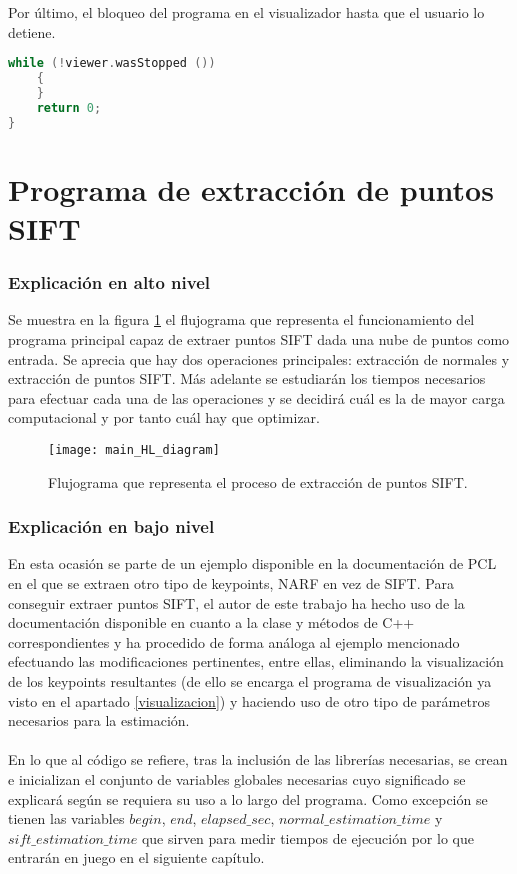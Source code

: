Por último, el bloqueo del programa en el visualizador hasta que el usuario lo detiene.
\begin{lstlisting}[language=C++,breaklines]
   while (!viewer.wasStopped ())
    {
    }
    return 0;
}
\end{lstlisting}
\fi


\section{Programa de extracción de puntos SIFT}\label{extraccion_sift}
\subsubsection{Explicación en alto nivel}
Se muestra en la figura \ref{fig:main_HL_diagram} el flujograma que representa el funcionamiento del programa principal capaz de extraer puntos SIFT dada una nube de puntos como entrada. Se aprecia que hay dos operaciones principales: extracción de normales\cite{normal} y extracción de puntos SIFT\cite{narf}. Más adelante se estudiarán los tiempos necesarios para efectuar cada una de las operaciones y se decidirá cuál es la de mayor carga computacional y por tanto cuál hay que optimizar.
\begin{figure}
\centering
\texttt{[image: main\_HL\_diagram]}
\caption{Flujograma que representa el proceso de extracción de puntos SIFT.}\label{fig:main_HL_diagram}
\end{figure}

\subsubsection{Explicación en bajo nivel}\label{sift_bajo_nivel}
En esta ocasión se parte de un ejemplo disponible en la documentación de PCL\cite{ejemplo_narf} en el que se extraen otro tipo de keypoints, NARF en vez de SIFT. Para conseguir extraer puntos SIFT, el autor de este trabajo ha hecho uso de la documentación disponible en cuanto a la clase y métodos de C++ correspondientes\cite{sift_class} y ha procedido de forma análoga al ejemplo mencionado efectuando las modificaciones pertinentes, entre ellas, eliminando la visualización de los keypoints resultantes (de ello se encarga el programa de visualización ya visto en el apartado \ref{visualizacion}) y haciendo uso de otro tipo de parámetros necesarios para la estimación.
\\
\\
En lo que al código se refiere, tras la inclusión de las librerías necesarias, se crean e inicializan el conjunto de variables globales necesarias cuyo significado se explicará según se requiera su uso a lo largo del programa. Como excepción se tienen las variables $begin$, $end$, $elapsed\_sec$, $normal\_estimation\_time$ y $sift\_estimation\_time$ que sirven para medir tiempos de ejecución por lo que entrarán en juego en el siguiente capítulo.

